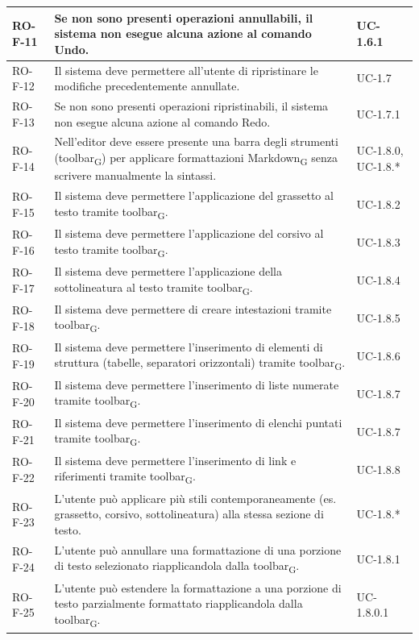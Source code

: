 \documentclass[11pt,a4paper]{article}
\newcommand{\gls}[1]{#1\textsubscript{G}}
\begin{document}
\begin{longtable}{|p{}|>{\raggedright\arraybackslash}p{}|p{}|}
\hline
RO-F-11 & Se non sono presenti operazioni annullabili, il sistema non esegue alcuna azione al comando Undo. & UC-1.6.1 \\
\hline
RO-F-12 & Il sistema deve permettere all'utente di ripristinare le modifiche precedentemente annullate. & UC-1.7 \\
\hline
RO-F-13 & Se non sono presenti operazioni ripristinabili, il sistema non esegue alcuna azione al comando Redo. & UC-1.7.1 \\
\hline
RO-F-14 & Nell'editor deve essere presente una barra degli strumenti (\gls{toolbar}) per applicare formattazioni \gls{Markdown} senza scrivere manualmente la sintassi. & UC-1.8.0, UC-1.8.* \\
\hline
RO-F-15 & Il sistema deve permettere l'applicazione del grassetto al testo tramite \gls{toolbar}. & UC-1.8.2 \\
\hline
RO-F-16 & Il sistema deve permettere l'applicazione del corsivo al testo tramite \gls{toolbar}. & UC-1.8.3 \\
\hline
RO-F-17 & Il sistema deve permettere l'applicazione della sottolineatura al testo tramite \gls{toolbar}. & UC-1.8.4 \\
\hline
RO-F-18 & Il sistema deve permettere di creare intestazioni tramite \gls{toolbar}. & UC-1.8.5 \\
\hline
RO-F-19 & Il sistema deve permettere l'inserimento di elementi di struttura (tabelle, separatori orizzontali) tramite \gls{toolbar}. & UC-1.8.6 \\
\hline
RO-F-20 & Il sistema deve permettere l'inserimento di liste numerate tramite \gls{toolbar}. & UC-1.8.7 \\
\hline
RO-F-21 & Il sistema deve permettere l'inserimento di elenchi puntati tramite \gls{toolbar}. & UC-1.8.7 \\
\hline
RO-F-22 & Il sistema deve permettere l'inserimento di link e riferimenti tramite \gls{toolbar}. & UC-1.8.8 \\
\hline
RO-F-23 & L'utente può applicare più stili contemporaneamente (es. grassetto, corsivo, sottolineatura) alla stessa sezione di testo. & UC-1.8.* \\
\hline
RO-F-24 & L'utente può annullare una formattazione di una porzione di testo selezionato riapplicandola dalla \gls{toolbar}. & UC-1.8.1 \\
\hline
RO-F-25 & L'utente può estendere la formattazione a una porzione di testo parzialmente formattato riapplicandola dalla \gls{toolbar}. & UC-1.8.0.1 \\

\end{longtable}
\end{document}
